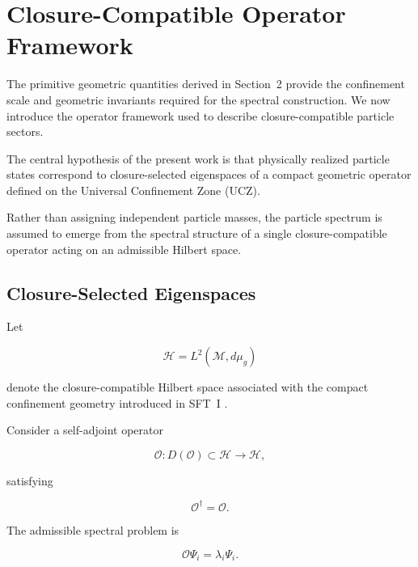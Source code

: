 \documentclass[11pt]{article}
\theoremstyle{definition}
\theoremstyle{remark}
\begin{document}

\section{Closure-Compatible Operator Framework}

The primitive geometric quantities derived in Section~2 provide
the confinement scale and geometric invariants required for the
spectral construction. We now introduce the operator framework
used to describe closure-compatible particle sectors.

The central hypothesis of the present work is that physically
realized particle states correspond to closure-selected
eigenspaces of a compact geometric operator defined on the
Universal Confinement Zone (UCZ).

Rather than assigning independent particle masses, the particle
spectrum is assumed to emerge from the spectral structure of a
single closure-compatible operator acting on an admissible
Hilbert space.


\subsection{Closure-Selected Eigenspaces}
\label{subsec:closure_selected_eigenspaces}

Let

\begin{equation}
\mathcal H =
L^2(\mathcal M,d\mu_g)
\end{equation}

denote the closure-compatible Hilbert space associated with the
compact confinement geometry introduced in SFT~I
\cite{Egbon2025I}.

Consider a self-adjoint operator

\begin{equation}
\mathcal O :
D(\mathcal O)
\subset
\mathcal H
\rightarrow
\mathcal H,
\end{equation}

satisfying

\begin{equation}
\mathcal O^\dagger = 
\mathcal O.
\end{equation}

The admissible spectral problem is

\begin{equation}
\mathcal O \Psi_i = 
\lambda_i \Psi_i.
\label{eq:spectral_problem}
\end{equation}
\end{document}
